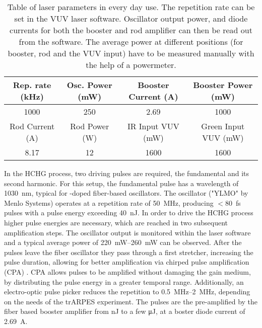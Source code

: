 \begin{table}[t]
	\centering
	\begin{tabular}{ *{4}{c} }
		\hline
		Rep. rate (\unit{\kilo\hertz})		& Osc. Power (\unit{\milli\watt}) 	& Booster Current (\unit{\ampere}) 		 & Booster Power (\unit{\milli\watt})	\\ \hline\hline
		1000								& 250							  	& 2.69								  	 & 1000									\\ \hline
		Rod Current (\unit{\ampere}) 		& Rod Power (\unit{\watt})			& IR Input VUV (\unit{\milli\watt})		 & Green Input VUV (\unit{\milli\watt})	\\ \hline\hline
		8.17								& 12					  			& 1600								   	 & 1600									\\ \hline
	\end{tabular}
	\caption{Table of laser parameters in every day use. The repetition rate can be set in the VUV laser software. Oscillator output power, and diode currents for both the booster and rod amplifier can then be read out from the software. The average power at different positions (for booster, rod and the VUV input) have to be measured manually with the help of a powermeter.}
	\label{tab:laser_param}
\end{table}

In the HCHG process, two driving pulses are required, the fundamental and its second harmonic.
For this setup, the fundamental pulse has a wavelength of \qty{1030}{\nano\meter}, typical for -doped fiber-based oscillators.
The oscillator ("YLMO" by Menlo Systems) operates at a repetition rate of \qty{50}{\mega\hertz}, producing $<$\qty{80}{\femto\second} pulses with a pulse energy exceeding \qty{40}{\nano\joule}.
In order to drive the HCHG process higher pulse energies are necessary, which are reached in two subsequent amplification steps.
The oscillator output is monitored within the laser software and a typical average power of \qtyrange{220}{260}{\milli\watt} can be observed.
After the pulses leave the fiber oscillator they pass through a first stretcher, increasing the pulse duration, allowing for better amplification via chirped pulse amplification (CPA) \cite{strickland_compression_1985,maine_generation_1988,strickland_chirped_2021}.
CPA allows pulses to be amplified without damaging the gain medium, by distributing the pulse energy in a greater temporal range. Additionally, an electro-optic pulse picker reduces the repetition to \qtyrange{0.5}{2}{\mega\hertz}, depending on the needs of the trARPES experiment.
The pulses are the pre-amplified by the fiber based booster amplifier from \unit{\nano\joule} to a few \unit{\micro\joule}, at a boster diode current of \qty{2.69}{\ampere}.

